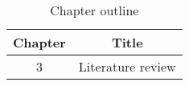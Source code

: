 \begin{table}[h!]
\centering
\begin{tabular}{cc}
{Chapter} & {Title} \\ \midrule
{3} & {Literature review} \\
\end{tabular}
\caption{Chapter outline}
\label{table:1}
\end{table}